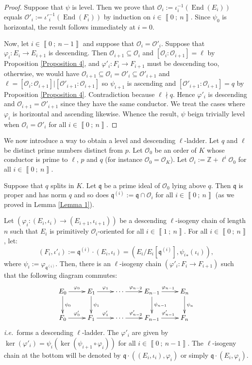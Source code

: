 \documentclass[a4paper,10pt]{report}
\theoremstyle{definition}
\theoremstyle{plain}
\theoremstyle{definition}
\newcommand{\ie}{\emph{i.e.}\ }
\newcommand{\Z}{\mathbb{Z}}
\newcommand{\mO}{\mathcal{O}}
\renewcommand{\i}[2]{\left\llbracket #1~;~#2\right\rrbracket}
\renewcommand{\(}{\left(}
\renewcommand{\)}{\right)}
\newcommand{\mf}[1]{\mathfrak{#1}}
\newcommand{\mfq}{\mathfrak{q}}
\DeclareMathOperator{\End}{End}
\begin{document}
\begin{proof}
Suppose that $\psi$ is level. Then we prove that $\mO_i:=\iota_i^{-1}(\End(E_i))$ equals $\mO'_i:={\iota'}_i^{-1}(\End(F_i))$ by induction on $i\in\i{0}{n}$. Since $\psi_0$ is horizontal, the result follows immediately at $i=0$. 

Now, let $i\in\i{0}{n-1}$ and suppose that $\mO_i=\mO'_i$. Suppose that $\varphi_i : E_i\longrightarrow E_{i+1}$ is descending. Then $\mO_{i+1}\subseteq\mO_i$ and $[\mO_i:\mO_{i+1}]=\ell$ by Proposition \ref{Proposition 4}, and $\varphi'_i: F_i\longrightarrow F_{i+1}$ must be descending too, otherwise, we would have $\mO_{i+1}\subseteq\mO_i=\mO'_i\subseteq \mO'_{i+1}$ and $\ell=[\mO_i:\mO_{i+1}]|[\mO'_{i+1}:\mO_{i+1}]$ so $\psi_{i+1}$ is ascending and $[\mO'_{i+1}:\mO_{i+1}]=q$ by Proposition \ref{Proposition 4}. Contradiction because $\ell\nmid q$.  Hence $\varphi'_i$ is descending and $\mO_{i+1}=\mO'_{i+1}$ since they have the same conductor. We treat the cases where $\varphi_i$ is horizontal and ascending likewise. Whence the result, $\psi$ beign trivially level when $\mO_i=\mO'_i$ for all $i\in\i{0}{n}$.
\end{proof}

We now introduce a way to obtain a level and descending $\ell$-ladder. Let $q$ and $\ell$ be distinct prime numbers distinct from $p$. Let $\mO_0$ be an order of $K$ whose conductor is prime to $\ell$,  $p$ and $q$ (for instance $\mO_0=\mO_K$).  Let $\mO_i:=\Z+\ell^i\mO_0$ for all $i\in\i{0}{n}$.

Suppose that $q$ splits in $K$. Let $\mfq$ be a prime ideal of $\mO_0$ lying above $q$. Then $\mfq$ is proper and has norm $q$ and so does $\mfq^{(i)}:=\mfq\cap\mO_i$ for all $i\in\i{0}{n}$ (as we proved in Lemma \ref{Lemma 1}).

Let $(\varphi_i: (E_i,\iota_i)\longrightarrow (E_{i+1},\iota_{i+1}))$ be a descending $\ell$-isogeny chain of length $n$ such that $E_i$ is primitively $\mO_i$-oriented for all $i\in\i{1}{n}$. For all $i\in\i{0}{n}$, let:
\[(F_i,\iota'_i):=\mfq^{(i)}\cdot(E_i,\iota_i)=(E_i/E_i[\mfq^{(i)}],{\psi_i}_*(\iota_i)),\]
where $\psi_i:=\varphi_{\mfq^{(i)}}$. Then, there is an $\ell$-isogeny chain $(\varphi'_i:F_i\longrightarrow F_{i+1})$ such that the following diagram commutes:
\[\xymatrix{
E_0 \ar[d]^{\psi_0} \ar[r]^{\varphi_0} & E_1\ar[d]^{\psi_1} \ar[r]^{\varphi_{1}}& \cdots \ar[r]^{\varphi_{n-2}} & E_{n-1} \ar[d]^{\psi_{n-1}} \ar[r]^{\varphi_{n-1}} & E_n \ar[d]^{\psi_n}\\
F_0 \ar[r]^{\varphi'_0} & F_1 \ar[r]^{\varphi'_{1}}& \cdots \ar[r]^{\varphi'_{n-2}} & F_{n-1} \ar[r]^{\varphi'_{n-1}} & F_n
}\]
\ie forms a descending $\ell$-ladder.  The $\varphi'_i$ are given by $\ker(\varphi'_i)=\psi_i(\ker(\psi_{i+1}\circ\varphi_i))$ for all $i\in\i{0}{n-1}$.  The $\ell$-isogeny chain at the bottom will be denoted by $\mf{q}\cdot((E_i,\iota_i),\varphi_i)$ or simply $\mf{q}\cdot(E_i,\varphi_i)$. 
\end{document}
